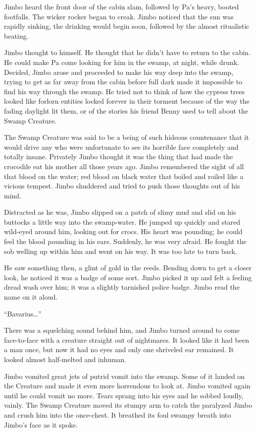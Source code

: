 Jimbo heard the front door of the cabin slam, followed by
Pa's heavy, booted footfalls. The wicker rocker began to
creak. Jimbo noticed that the sun was rapidly sinking, the drinking
would begin soon, followed by the almost ritualistic beating.

Jimbo thought to himself. He thought that he didn't have to
return to the cabin. He could make Pa come looking for him in the
swamp, at night, while drunk. Decided, Jimbo arose and proceeded to
make his way deep into the swamp, trying to get as far away from
the cabin before full dark made it impossible to find his way
through the swamp. He tried not to think of how the cypress trees
looked like forlorn entities locked forever in their torment
because of the way the fading daylight lit them, or of the stories
his friend Benny used to tell about the Swamp Creature.

The Swamp Creature was said to be a being of such hideous
countenance that it would drive any who were unfortunate to see its
horrible face completely and totally insane. Privately Jimbo
thought it was the thing that had made the crocodile eat his mother
all those years ago. Jimbo remembered the sight of all that blood
on the water; red blood on black water that boiled and roiled like
a vicious tempest. Jimbo shuddered and tried to push those thoughts
out of his mind.

Distracted as he was, Jimbo slipped on a patch of slimy mud and
slid on his buttocks a little way into the swamp-water. He jumped
up quickly and stared wild-eyed around him, looking out for crocs.
His heart was pounding; he could feel the blood pounding in his
ears. Suddenly, he was very afraid. He fought the sob welling up
within him and went on his way. It was too late to turn back.

He saw something then, a glint of gold in the reeds. Bending down
to get a closer look, he noticed it was a badge of some sort. Jimbo
picked it up and felt a feeling dread wash over him; it was a
slightly tarnished police badge. Jimbo read the name on it
aloud.

``Bavarius{\ldots}''

There was a squelching sound behind him, and Jimbo turned around to
come face-to-face with a creature straight out of nightmares. It
looked like it had been a man once, but now it had no eyes and only
one shriveled ear remained. It looked almost half-melted and
inhuman.

Jimbo vomited great jets of putrid vomit into the swamp. Some of it
landed on the Creature and made it even more horrendous to look at.
Jimbo vomited again until he could vomit no more. Tears sprang into
his eyes and he sobbed loudly, vainly. The Swamp Creature moved its
stumpy arm to catch the paralyzed Jimbo and crush him into the
once-chest. It breathed its foul swampy breath into Jimbo's
face as it spoke.

